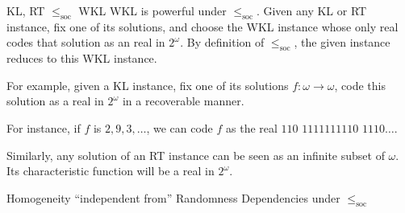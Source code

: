 \begin{frame}{KL, RT $\leq_{\text{soc}}$ WKL}
  WKL is powerful under $\leq_{\text{soc}}$. Given any KL or RT
  instance, fix one of its solutions, and choose the WKL instance whose only
  real codes that solution as an real in $2^\omega$. By definition of
  $\leq_{\text{soc}}$, the given instance reduces to this WKL instance.

  \vspace{1em}
  For example, given a KL instance, fix one of its solutions
  $f:\omega\rightarrow\omega$, code this solution as a real in $2^\omega$
  in a recoverable manner.

  \vspace{1em}
  For instance, if $f$ is $2,9,3,\ldots$, we can code $f$ as the real
  $110$ $1111111110$ $1110\ldots$.

  \vspace{1em}
  Similarly, any solution of an RT instance can be seen as an infinite
  subset of $\omega$. Its characteristic function will be a real in
  $2^\omega$.
\end{frame}

\begin{frame}{Homogeneity ``independent from'' Randomness}
  Dependencies under $\leq_{\text{soc}}$
  \vspace{2em}

  \begin{center}
  \end{center}
\end{frame}
